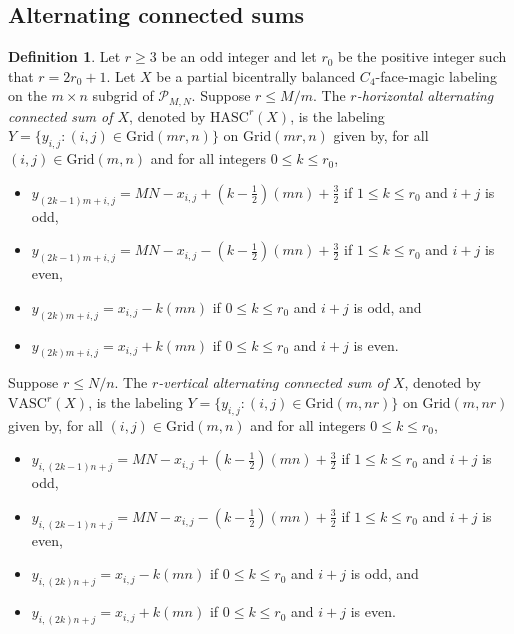 \documentclass[12pt]{amsart}
\theoremstyle{definition}
\newtheorem{definition}{Definition}
\theoremstyle{plain}
\begin{document}
\subsection{Alternating connected sums}


\begin{definition} \label{defnHorizontalAlternatingConnectedSum}
  Let $r \geqslant 3$ be an odd integer and let $r_0$ be the positive integer such that $r=2r_0 +1$.
  Let $X$ be a partial  bicentrally balanced $C_4$-face-magic labeling on the $m \times n$ subgrid of $\mathcal{P}_{M,N}$.
  Suppose $r \leqslant M/m$.
  The \textit{$r$-horizontal alternating connected sum of $X$}, denoted by $\mathrm{HASC}^r(X)$,
  is the labeling $Y=\{ y_{i,j} : (i,j) \in \mathrm{Grid}(mr,n) \}$ on $\mathrm{Grid}(mr,n)$ given by,
  for all $(i,j) \in \mathrm{Grid}(m,n)$ and for all integers $0 \leqslant k \leqslant r_0$,
  \begin{itemize}
    \item $ y_{(2k-1)m+i,j} = MN - x_{i,j} +(k-\tfrac{1}{2})(mn) +\tfrac{3}{2}$ if $1 \leqslant k \leqslant r_0$ and $i+j$ is odd,
    \item $ y_{(2k-1)m+i,j} = MN - x_{i,j} -(k-\tfrac{1}{2})(mn) + \tfrac{3}{2}$ if $1 \leqslant k \leqslant r_0$ and $i+j$ is even,
    \item $ y_{(2k)m+i,j} = x_{i,j} -k(mn)$ if $0 \leqslant k \leqslant r_0$ and $i+j$ is odd, and
    \item $ y_{(2k)m+i,j} = x_{i,j} +k(mn)$ if $0 \leqslant k \leqslant r_0$ and $i+j$ is even.
  \end{itemize}

  Suppose $r \leqslant N/n$.
  The \textit{$r$-vertical alternating connected sum of $X$}, denoted by $\mathrm{VASC}^r(X)$,
  is the labeling $Y=\{ y_{i,j} : (i,j) \in \mathrm{Grid}(m,nr) \}$ on $\mathrm{Grid}(m,nr)$ given by,
  for all $(i,j) \in \mathrm{Grid}(m,n)$ and for all integers $0 \leqslant k \leqslant r_0$,
  \begin{itemize}
    \item $ y_{i,(2k-1)n+j} = MN - x_{i,j} +(k-\tfrac{1}{2})(mn) +\tfrac{3}{2}$ if $1 \leqslant k \leqslant r_0$ and $i+j$ is odd,
    \item $ y_{i,(2k-1)n+j} = MN - x_{i,j} -(k-\tfrac{1}{2})(mn)  + \tfrac{3}{2}$ if $1 \leqslant k \leqslant r_0$ and $i+j$ is even,
    \item $ y_{i,(2k)n+j} = x_{i,j} -k(mn)$ if $0 \leqslant k \leqslant r_0$ and $i+j$ is odd, and
    \item $ y_{i,(2k)n+j} = x_{i,j} +k(mn)$ if $0 \leqslant k \leqslant r_0$ and $i+j$ is even.
  \end{itemize}
\end{definition}
\end{document}
